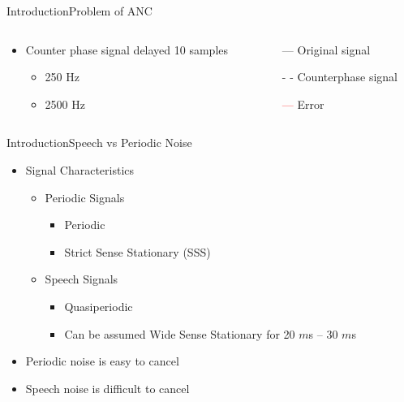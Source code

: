 \begin{frame}{Introduction}{Problem of ANC}		
	\begin{columns}
		\begin{column}{0.5\textwidth}
			\begin{itemize}
				\item Counter phase signal delayed 10 samples	
				\begin{itemize}
					\item 250 Hz
					\item 2500 Hz 
				\end{itemize}	
			\end{itemize}
			\vspace{-6.5mm}			
		\begin{center}
	 		
	 	\end{center}
		\end{column}
		\begin{column}{0.5\textwidth} 
		\begin{itemize}
			\item[\textcolor{MATLABblue}{---}] Original signal
			\item[\textcolor{MATLABblue}{- -}] Counterphase signal
			\item[\textcolor{red}{---}] Error
		\end{itemize}
		\begin{center}
	 		
	 	\end{center}
		\end{column}
	\end{columns}
\end{frame}





\begin{frame}{Introduction}{Speech vs Periodic Noise}		
	\begin{itemize}
		\item Signal Characteristics
		\begin{itemize}
			\item Periodic Signals
			\begin{itemize}
				\item Periodic
				\item Strict Sense Stationary (SSS)
			\end{itemize}
			\item Speech Signals
			\begin{itemize}
				\item Quasiperiodic
				\item Can be assumed Wide Sense Stationary for 20 $m$s -- 30 $m$s 
			\end{itemize}
		\end{itemize}
		\item Periodic noise is easy to cancel
		\item Speech noise is difficult to cancel
	\end{itemize}
\end{frame}




